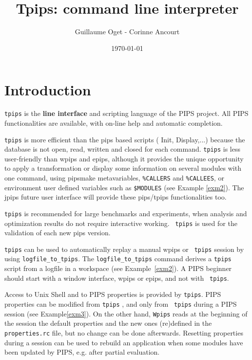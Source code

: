 \documentclass[a4paper,12pt]{article}
\title{Tpips: command line interpreter}
\author{Guillaume Oget - Corinne Ancourt}
\date{\today}
\begin{document}
\setlength{\parindent}{0in}

\maketitle


\tableofcontents

\section{Introduction}


{\tt tpips} is the {\bf line interface} and scripting language of the
PIPS project. All PIPS functionalities are available, with
on-line help and automatic completion.

{\tt tpips} is more efficient than the pips based scripts ( Init,
Display,...) because the database is not open, read, written and closed
for each command. {\tt tpips} is less user-friendly than wpips and epips,
although it provides the unique opportunity to apply a transformation or
display some information on several modules with one command, using
pipsmake metavariables, 
\verb+%CALLERS+ and  \verb+%CALLEES+,  
or environment  user defined variables such
as \verb+$MODULES+ %
(see Example \ref{exm2}). The jpips future user
interface will provide these pips/tpips functionalities too.

{\tt tpips} is recommended for large benchmarks and experiments, when
analysis and optimization results do not require interactive working. {\tt
  tpips} is used for the validation of each new pips version.

{\tt tpips} can be used to automatically replay a manual wpips or {\tt
  tpips} session by using \verb+logfile_to_tpips+. The
\verb+logfile_to_tpips+ command derives a {\tt tpips} script
from a logfile in a workspace (see Example~\ref{exm2}). A PIPS beginner
should start with a window interface, wpips or epips, and not with {\tt
  tpips}.


Access to Unix Shell and to PIPS properties is provided by {\tt tpips}.
PIPS properties can be modified from {\tt tpips} , and only from {\tt
  tpips} during a PIPS session (see Example\ref{exm3}). On the other hand,
{\tt Wpips} reads at the
beginning of the session the default properties and the new ones
(re)defined in the {\tt properties.rc} file, but no change can be done
afterwards.  Resetting properties during a session can be used to rebuild
an application when some modules have been updated by PIPS, e.g. after
partial evaluation.
\end{document}
